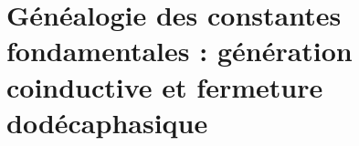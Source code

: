 



\part{Généalogie des constantes fondamentales : génération coinductive et fermeture dodécaphasique}






